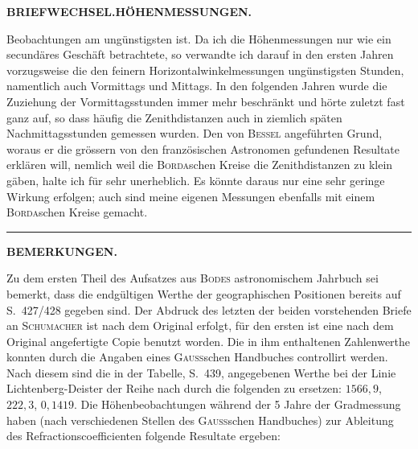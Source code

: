 \par\clearpage
\noindent{}\hfill{\small\textbf{BRIEFWECHSEL.\quad HÖHENMESSUNGEN.}}\hfill\null\par\medskip
\noindent Beobachtungen am ungünstigsten ist. Da ich die Höhenmessungen nur wie
ein secundäres Geschäft betrachtete, so verwandte ich darauf in den ersten
Jahren vorzugsweise die den feinern Horizontalwinkelmessungen ungünstigsten
Stunden, namentlich auch Vormittags und Mittags. In den folgenden Jahren
wurde die Zuziehung der Vormittagsstunden immer mehr beschränkt und hörte
zuletzt fast ganz auf, so dass häufig die Zenithdistanzen auch in ziemlich
späten Nachmittagsstunden gemessen wurden. Den von \textsc{Bessel} angeführten
Grund, woraus er die grössern von den französischen Astronomen gefundenen
Resultate erklären will, nemlich weil die \textsc{Borda}schen Kreise die Zenithdistanzen zu klein gäben, halte ich für sehr unerheblich. Es könnte daraus nur
eine sehr geringe Wirkung erfolgen; auch sind meine eigenen Messungen
ebenfalls mit einem \textsc{Borda}schen Kreise gemacht.
\begin{center}\rule{.16\linewidth}{.4pt}\end{center}
\begin{center}\textbf{BEMERKUNGEN.}\end{center}
\begingroup\small
\par\noindent\hspace*{\parindent}Zu dem ersten Theil des Aufsatzes aus \textsc{Bodes} astronomischem Jahrbuch sei bemerkt, dass die endgültigen Werthe der geographischen Positionen bereits auf S.~427/428 gegeben sind. Der Abdruck des
letzten der beiden vorstehenden Briefe an \textsc{Schumacher} ist nach dem Original erfolgt, für den ersten ist
eine nach dem Original angefertigte Copie benutzt worden. Die in ihm enthaltenen Zahlenwerthe konnten
durch die Angaben eines \textsc{Gauss}schen Handbuches controllirt werden. Nach diesem sind die in der Tabelle,
S.~439, angegebenen Werthe bei der Linie Lichtenberg-Deister der Reihe nach durch die folgenden zu ersetzen: \(1566{,}9\), \(222{,}3\), \(0{,}1419\). Die Höhenbeobachtungen während der 5 Jahre der Gradmessung haben (nach
verschiedenen Stellen des \textsc{Gauss}schen Handbuches) zur Ableitung des Refractionscoefficienten folgende Resultate ergeben:
